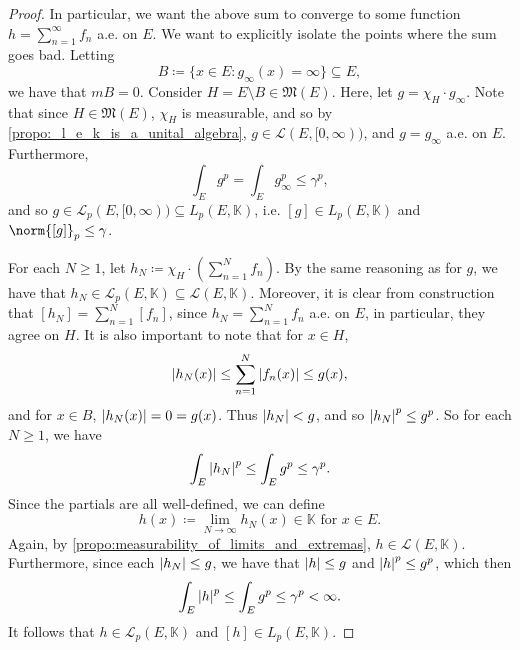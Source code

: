 \documentclass[notoc,notitlepage]{tufte-book}
\begin{document}
\begin{proof}
  \noindent
   In
  particular, we want the above sum to converge to some function $h =
  \sum_{n=1}^{\infty} f_n$ a.e. on $E$. We want to explicitly isolate the points
  where the sum goes bad. Letting
  \begin{equation*}
    B \coloneqq \{ x \in E : g_\infty(x) = \infty \} \subseteq E,
  \end{equation*}
  we have that $mB = 0$. Consider $H = E \setminus B \in \mathfrak{M}(E)$.
   Here, let $g = \chi_H \cdot
  g_\infty$. Note that since $H \in \mathfrak{M}(E)$, $\chi_H$ is measurable,
  and so by \cref{propo:_l_e_k_is_a_unital_algebra}, $g \in \mathcal{L}(E,
  [0, \infty))$, and $g = g_\infty$ a.e. on $E$. Furthermore,
  \begin{equation*}
    \int_{E} g^p = \int_{E} g_\infty^p \leq \gamma^p,
  \end{equation*}
  and so $g \in \mathcal{L}_p(E, [0, \infty)) \subseteq L_p(E, \mathbb{K})$,
  i.e. $[g] \in L_p(E, \mathbb{K})$ and $\norm{[g]}_p \leq \gamma$.
  
  For each $N \geq 1$, let $h_N \coloneqq \chi_H \cdot
  \left( \sum_{n=1}^{N} f_n \right)$. By the same reasoning as for $g$, we have
  that $h_N \in \mathcal{L}_p(E, \mathbb{K}) \subseteq \mathcal{L}(E,
  \mathbb{K})$. Moreover, it is clear from construction that $[h_N] =
  \sum_{n=1}^{N} [f_n]$, since $h_N = \sum_{n=1}^{N} f_n$ a.e. on $E$, in
  particular, they agree on $H$. It is also important to note that for $x \in
  H$,
  \begin{equation*}
    \left|h_N(x)\right| \leq \sum_{n=1}^{N} \left|f_n(x)\right| \leq g(x),
  \end{equation*}
  and for $x \in B$, $\left|h_N(x)\right| = 0 = g(x)$. Thus $\left|h_N\right| < g$, and so
  $\left|h_N\right|^p \leq g^p$. So for each $N \geq 1$, we have
  \begin{equation*}
    \int_{E} \left|h_N\right|^p \leq \int_{E} g^p \leq \gamma^p.
  \end{equation*}
  Since the partials are all well-defined, we can define
  \begin{equation*}
    h(x) \coloneqq \lim_{N \to \infty} h_N(x) \in \mathbb{K} \text{ for } x \in
    E.
  \end{equation*}
  Again, by \cref{propo:measurability_of_limits_and_extremas}, $h \in
  \mathcal{L}(E, \mathbb{K})$. Furthermore, since each $\left|h_N\right| \leq g$, we
  have that $\left|h\right| \leq g$ and $\left|h\right|^p \leq g^p$, which then
  \begin{equation*}
    \int_{E} \left|h\right|^p \leq \int_{E} g^p \leq \gamma^p < \infty.
  \end{equation*}
  It follows that $h \in \mathcal{L}_p(E, \mathbb{K})$ and $[h] \in L_p(E,
  \mathbb{K})$.


\end{proof}
\end{document}
